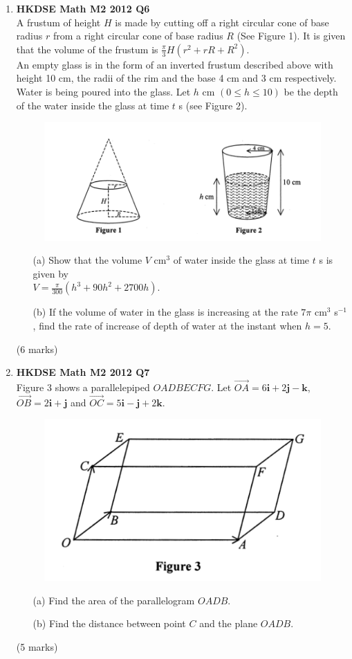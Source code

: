 \documentclass[12pt]{article}
\begin{document}
\begin{enumerate}
	\item \textbf{HKDSE Math M2 2012 Q6}\\
	A frustum of height $H$ is made by cutting off a right circular cone of base radius $r$ from a right circular cone of base radius $R$ (See Figure 1). It is given that the volume of the frustum is $\displaystyle\frac{\pi}{3}H(r^2 + rR + R^2)$. \\
	An empty glass is in the form of an inverted frustum described above with height 10 cm, the radii of the rim and the base 4 cm and 3 cm respectively. Water is being poured into the glass. Let $h$ cm $(0 \leq h \leq 10)$ be the depth of the water inside the glass at time $t$ s (see Figure 2).
	\begin{figure}[H]
		\centering
		\includegraphics[width = .5\linewidth]{2012Figure1n2}
	\end{figure}
	\begin{enumerate}
		\item [(a)]Show that the volume $V$ cm$^{3}$ of water inside the glass at time $t$ s is given by \\
		$V = \displaystyle\frac{\pi}{300}(h^3+90h^2+2700h)$. 
		\item [(b)]If the volume of water in the glass is increasing at the rate $7\pi$ cm$^3$ s$^{-1}$, find the rate of increase of depth of water at the instant when $h = 5$.
	\end{enumerate}
	(6 marks)

	\item \textbf{HKDSE Math M2 2012 Q7}\\
	Figure 3 shows a parallelepiped $OADBECFG$. Let $\overrightarrow{OA} = 6\textbf{i} +2\textbf{j} -\textbf{k}$, $\overrightarrow{OB} = 2\textbf{i} +\textbf{j} $ and $\overrightarrow{OC} = 5\textbf{i} -\textbf{j} +2\textbf{k}$.
	\begin{figure}[H]
		\centering
		\includegraphics[width = .5\linewidth]{2012Figure3}
	\end{figure}
	\begin{enumerate}
		\item [(a)]Find the area of the parallelogram $OADB$. 
		\item [(b)]Find the distance between point $C$ and the plane $OADB$.
	\end{enumerate}
	(5 marks)


\end{enumerate}
\end{document}
